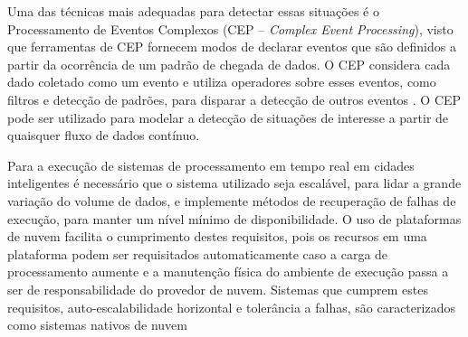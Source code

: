 Uma das técnicas mais adequadas para detectar essas situações é o Processamento de Eventos Complexos (CEP – \textit{Complex Event Processing}), visto que ferramentas de CEP fornecem modos de declarar eventos que são definidos a partir da ocorrência de um padrão de chegada de dados. O CEP considera cada dado coletado como um evento e utiliza operadores sobre esses eventos, como filtros e detecção de padrões, para disparar a detecção de outros eventos \citep{Etzion:2010:EPA:1894960}.
O CEP pode ser utilizado para modelar a detecção de situações de interesse a partir de quaisquer fluxo de dados contínuo. 

Para a execução de sistemas de processamento em tempo real em cidades inteligentes é necessário que o sistema utilizado seja escalável, para lidar a grande variação do volume de dados, e implemente métodos de recuperação de falhas de execução, para manter um nível mínimo de disponibilidade. O uso de plataformas de nuvem facilita o cumprimento destes requisitos, pois os recursos em uma plataforma podem ser requisitados automaticamente caso a carga de processamento aumente e a manutenção física do ambiente de execução passa a ser de responsabilidade do provedor de nuvem. Sistemas que cumprem estes requisitos, auto-escalabilidade horizontal e tolerância a falhas, são caracterizados como sistemas nativos de nuvem~\citep{garrison2017cloud}



